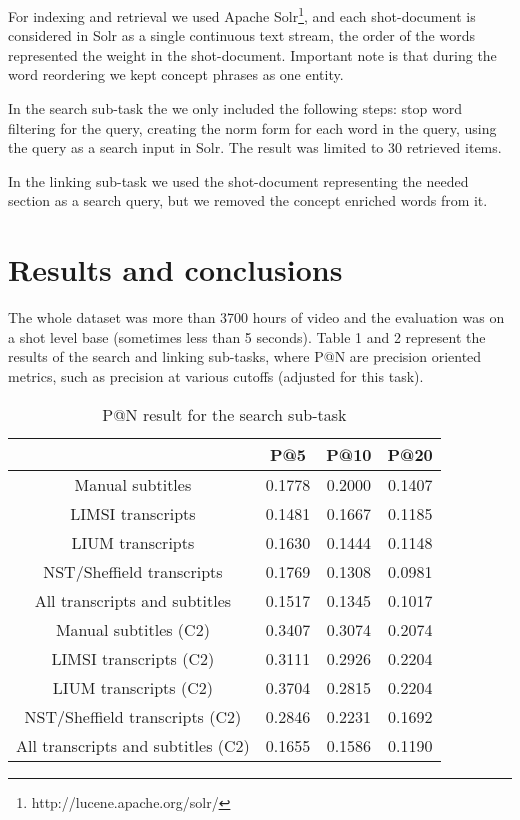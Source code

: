 \documentclass{acm_proc_article-me}
\begin{document}
For indexing and retrieval we used Apache Solr\footnote{http://lucene.apache.org/solr/}, and each shot-document is considered in Solr as a single continuous text stream, the order of the words represented the weight in the shot-document. Important note is that during the word reordering we kept concept phrases as one entity.

In the search sub-task the we only included the following steps: stop word filtering for the query, creating the norm form for each word in the query, using the query as a search input in Solr. The result was limited to 30 retrieved items.

In the linking sub-task we used the shot-document representing the needed section as a search query, but we removed the concept enriched words from it. %

\section{Results and conclusions}

The whole dataset was more than 3700 hours of video and the evaluation was on a shot level base (sometimes less than 5 seconds). Table 1 and 2 represent the results of the search and linking sub-tasks, where P@N are precision oriented metrics, such as precision at various cutoffs (adjusted for this task).\cite{DBLPjournalscorrAlyEOJ13}


\begin{table}[h]
\begin{tabular}{|c|c|c|c|}
	\hline 
	& P@5 & P@10 & P@20\tabularnewline
	\hline 
	\hline 
	Manual subtitles & 0.1778 & 0.2000 & 0.1407\tabularnewline
	\hline 
	LIMSI transcripts & 0.1481 & 0.1667 & 0.1185\tabularnewline
	\hline 
	LIUM transcripts & 0.1630 & 0.1444 & 0.1148\tabularnewline
	\hline 
	NST/Sheffield transcripts& 0.1769 & 0.1308 & 0.0981\tabularnewline
	\hline 
	All transcripts and subtitles & 0.1517 & 0.1345 & 0.1017\tabularnewline
	\hline 
	Manual subtitles (C2) & 0.3407 & 0.3074 & 0.2074\tabularnewline
	\hline 
	LIMSI transcripts (C2) & 0.3111 & 0.2926 & 0.2204\tabularnewline
	\hline 
	LIUM transcripts (C2) & 0.3704 & 0.2815 & 0.2204\tabularnewline
	\hline 
	NST/Sheffield transcripts (C2) & 0.2846 & 0.2231 & 0.1692\tabularnewline	
	\hline 
	All transcripts and subtitles (C2) & 0.1655 & 0.1586 & 0.1190\tabularnewline	
	\hline 
\end{tabular}
\caption{P@N result for the search sub-task}
\end{table}
\end{document}
